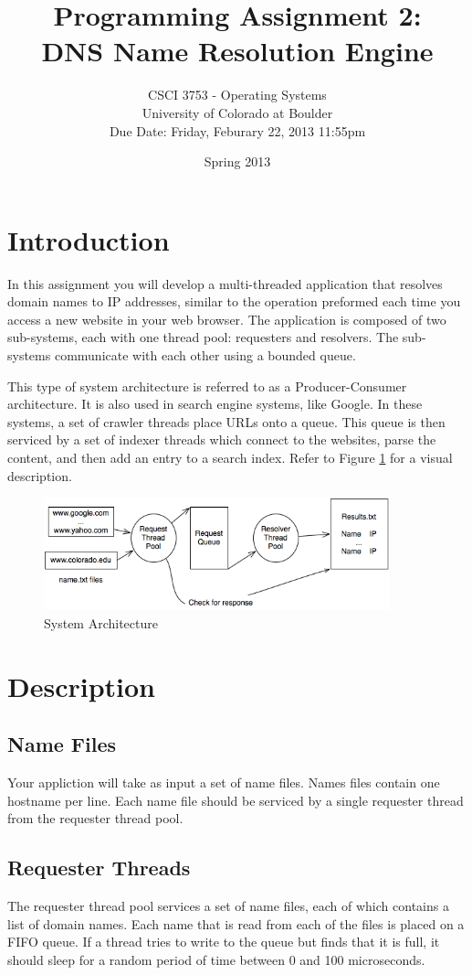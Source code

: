 \documentclass[12pt]{article}
\title{Programming Assignment 2:\\DNS Name Resolution Engine}
\author{
  CSCI 3753 - Operating Systems\\
  University of Colorado at Boulder\\
  Due Date:  Friday, Feburary 22, 2013 11:55pm
}
\date{Spring 2013}
\begin{document}
\maketitle

\section{Introduction}
In this assignment you will develop a multi-threaded
application that resolves domain names to IP addresses, similar to the
operation preformed each time you access a new website in your web browser.
The application is composed of two sub-systems, each with one thread pool:
requesters and resolvers. The sub-systems
communicate with each other using a bounded queue.

This type of system architecture is referred to as a Producer-Consumer
architecture. It is also used in search engine
systems, like Google. In these systems, a set of crawler threads place
URLs onto a queue. This queue is then serviced by a set of indexer
threads which connect to the websites, parse the content, and then add
an entry to a search index. Refer to Figure \ref{fig:sys} for a
visual description.

\begin{figure}[htbp]
  \begin{center}
    \includegraphics[width=100mm]{pa2.png}
    \caption{System Architecture}
    \label{fig:sys}
  \end{center}
\end{figure}

\section{Description}
\subsection{Name Files}
Your appliction will take as input a set of name files. Names files
contain one hostname per line. Each name file should be serviced by a
single requester thread from the requester thread pool.

\subsection{Requester Threads}
The requester thread pool
services a set of name files, each of which contains a list of domain
names. Each name that is
read from each of the files is placed on a FIFO queue.
If a thread tries to write to the
queue but finds that it is full, it should sleep for a random period
of time between 0 and 100 microseconds.
\end{document}
